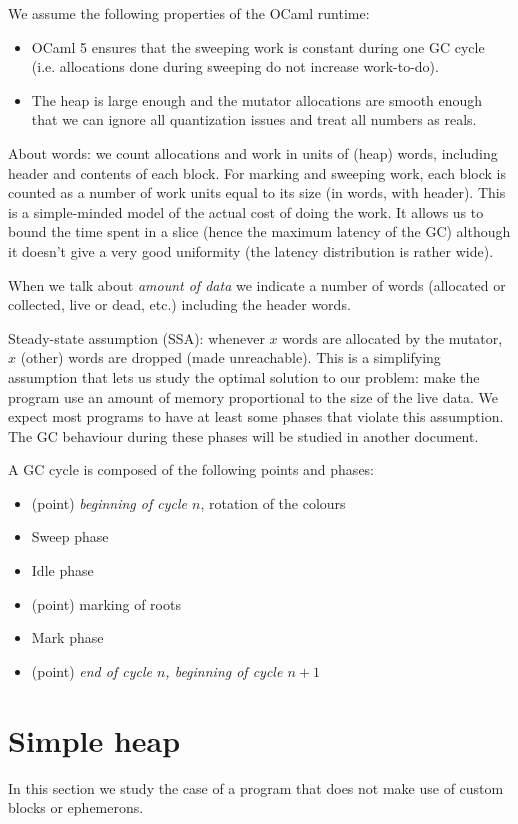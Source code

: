 \documentclass{article}
\begin{document}
We assume the following properties of the OCaml runtime:
\begin{itemize}
\item OCaml 5 ensures that the sweeping work is constant during one GC cycle
(i.e. allocations done during sweeping do not increase work-to-do).
\item The heap is large enough and the mutator allocations are smooth
enough that we can ignore all quantization issues and treat all
numbers as reals.
\end{itemize}

About words: we count allocations and work in units of (heap) words,
including header and contents of each block. For marking and sweeping
work, each block is counted as a number of work units equal to
its size (in words, with header). This is a simple-minded model of the actual
cost of doing the work. It allows us to bound the time spent in a
slice (hence the maximum latency of the GC) although it doesn't give a
very good uniformity (the latency distribution is rather wide).

When we talk about \emph{amount of data} we indicate a number of
words (allocated or collected, live or dead, etc.) including the
header words.

Steady-state assumption (SSA): whenever $x$
words are allocated by the mutator, $x$ (other) words are dropped (made
unreachable). This is a simplifying assumption that lets us study the
optimal solution to our problem: make the program use an amount of
memory proportional to the size of the live data. We expect most
programs to have at least some phases that violate this
assumption. The GC behaviour during these phases will be studied in
another document.

A GC cycle is composed of the following points and phases:
\begin{itemize}
\item (point) \emph{beginning of cycle $n$}, rotation of the colours
\item Sweep phase
\item Idle phase
\item (point) marking of roots
\item Mark phase
\item (point) \emph{end of cycle $n$, beginning of cycle $n+1$}
\end{itemize}

\section{Simple heap}
In this section we study the case of a program that does not make use
of custom blocks or ephemerons.
\end{document}
